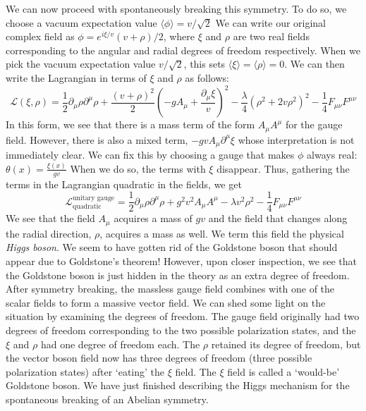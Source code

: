 We can now proceed with spontaneously breaking this symmetry. To do so, we choose a vacuum expectation value $\langle\phi\rangle = v/\sqrt{2}$ We can write our original complex field as $\phi = e^{i\xi/v}(v+\rho)/2$, where $\xi$ and $\rho$ are two real fields corresponding to the angular and radial degrees of freedom respectively. When we pick the vacuum expectation value $v/\sqrt{2}$, this sets $\langle\xi\rangle = \langle\rho\rangle=0$. We can then write the Lagrangian in terms of $\xi$ and $\rho$ as follows:
\begin{equation*}
\mathcal{L}(\xi,\rho) = \frac{1}{2}\partial_\mu\rho\partial^\mu\rho + \frac{(v + \rho)^2}{2}%
\left(-gA_\mu+\frac{\partial_\mu\xi}{v}\right)^2-\frac{\lambda}{4}\left(\rho^2 + 2v\rho^2\right)^2%
-\frac{1}{4}F_{\mu\nu}F^{\mu\nu}
\end{equation*}
In this form, we see that there is a mass term of the form $A_\mu A^\mu$ for the gauge field. However, there is also a mixed term, $-gvA_\mu\partial^\mu\xi$ whose interpretation is not immediately clear. We can fix this by choosing a gauge that makes $\phi$ always real:
$\theta(x) = \frac{\xi(x)}{gv}$
When we do so, the terms with $\xi$ disappear. Thus, gathering the terms in the Lagrangian quadratic in the fields, we get
\begin{equation}
\mathcal{L}_\text{quadratic}^\text{unitary gauge} = \frac{1}{2}\partial_\mu\rho\partial^\mu\rho + g^2v^2 A_\mu A^\mu - \lambda v^2\rho^2 - \frac{1}{4}F_{\mu\nu}F^{\mu\nu}
\end{equation}
We see that the field $A_\mu$ acquires a mass of $gv$ and the field that changes along the radial direction, $\rho$, acquires a mass as well. We term this field the physical \emph{Higgs boson}. We seem to have gotten rid of the Goldstone boson that should appear due to Goldstone’s theorem! However, upon closer inspection, we see that the Goldstone boson is just hidden in the theory as an extra degree of freedom. After symmetry breaking, the massless gauge field combines with one of the scalar fields to form a massive vector field. We can shed some light on the situation by examining the degrees of freedom. The gauge field originally had two degrees of freedom corresponding
to the two possible polarization states, and the $\xi$ and $\rho$ had one degree of freedom each. The $\rho$ retained its degree of freedom, but the vector boson field now has three degrees of freedom (three possible polarization states) after `eating' the $\xi$ field. The $\xi$ field is called a `would-be' Goldstone boson. We have just finished describing the Higgs mechanism for the spontaneous breaking of an Abelian symmetry.

